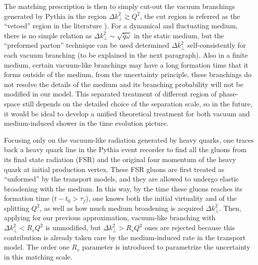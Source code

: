 The matching prescription is then to simply cut-out the vacuum branchings generated by Pythia in the region $\Delta k_\perp^2 \gtrsim Q^2$, the cut region is referred as the ``vetoed'' region in the literature \cite{PhysRevLett.120.232001}).
For a dynamical and fluctuating medium, there is no simple relation as $\Delta k_\perp^2\sim \sqrt{\hat{q}\omega}$ in the static medium, but the ``preformed parton'' technique can be used determined $\Delta k_\perp^2$ self-consistently for each vacuum branching (to be explained in the next paragraph).
Also in a finite medium, certain vacuum-like branchings may have a long formation time that it forms outside of the medium, from the uncertainty principle, these branchings do not resolve the details of the medium and its branching probability will not be modified in our model.
This separated treatment of different region of phase-space still depends on the detailed choice of the separation scale, so in the future, it would be ideal to develop a unified theoretical treatment for both vacuum and medium-induced shower in the time evolution picture.

Focusing only on the vacuum-like radiation generated by heavy quarks, one traces back a heavy quark line in the Pythia event recorder to find all the gluons from its final state radiation (FSR) and the original four momentum of the heavy quark at initial production vertex.
These FSR gluons are first treated as ``unformed'' by the transport models, and they are allowed to undergo elastic broadening with the medium.
In this way, by the time these gluons reaches its formation time ($t-t_0>\tau_f$), one knows both the initial virtuality and of the splitting $Q^2$, as well as how much medium broadening is acquired $\Delta k_\perp^2$.
Then, applying for our previous approximation, vacuum-like branching with 
$\Delta k_\perp^2 < R_v Q^2$ is unmodified, but $\Delta k_\perp^2 > R_v Q^2$ ones are rejected because this contribution is already taken care by the medium-induced rate in the transport model.
The order one $R_v$ parameter is introduced to parametrize the uncertainty in this matching scale.

